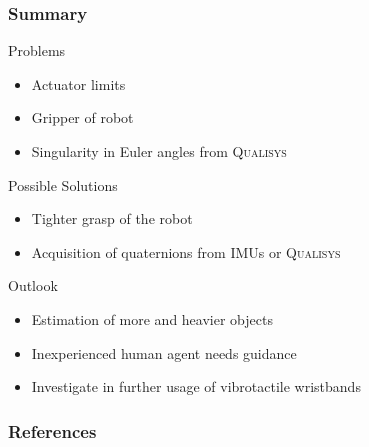 \documentclass[student,noshadow]{ITRslides}
\begin{document}
\begin{frame}
	\frametitle{Summary}
	\begin{block}{Problems}
		\begin{itemize}
			\item Actuator limits
			\item Gripper of robot
			\item Singularity in Euler angles from \textsc{Qualisys}
		\end{itemize}	   
	\end{block}	
	\begin{block}{Possible Solutions}
		\begin{itemize}
			\item Tighter grasp of the robot
			\item Acquisition of quaternions from IMUs or \textsc{Qualisys}
		\end{itemize}  
	\end{block}	
	\begin{block}{Outlook}
		\begin{itemize}
			\item Estimation of more and heavier objects
			\item Inexperienced human agent needs guidance
			\item Investigate in further usage of vibrotactile wristbands
		\end{itemize}
	\end{block}	
\end{frame}

\appendix
\begin{frame}
	\frametitle{References}
	\printbibliography
\end{frame}
\end{document}
